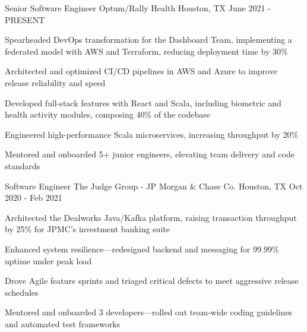 
\begin{cventries}

  \cventry
    {Senior Software Engineer}
    {Optum/Rally Health}
    {Houston, TX}
    {June 2021 - PRESENT}
    {
      \begin{cvitems}
        \item {Spearheaded DevOps transformation for the Dashboard Team, implementing a federated model with AWS and Terraform, reducing deployment time by 30\%}
        \item {Architected and optimized CI/CD pipelines in AWS and Azure to improve release reliability and speed}
        \item {Developed full-stack features with React and Scala, including biometric and health activity modules, composing 40\% of the codebase}
        \item {Engineered high-performance Scala microservices, increasing throughput by 20\%}
        \item {Mentored and onboarded 5+ junior engineers, elevating team delivery and code standards}
      \end{cvitems}
    }

  \cventry
    {Software Engineer}
    {The Judge Group - JP Morgan \& Chase Co.}
    {Houston, TX}
    {Oct 2020 - Feb 2021}
    {
      \begin{cvitems}
        \item {Architected the Dealworks Java/Kafka platform, raising transaction throughput by 25\% for JPMC’s investment banking suite}
        \item {Enhanced system resilience—redesigned backend and messaging for 99.99\% uptime under peak load}
        \item {Drove Agile feature sprints and triaged critical defects to meet aggressive release schedules}
        \item {Mentored and onboarded 3 developers—rolled out team‑wide coding guidelines and automated test frameworks}
      \end{cvitems}
    }


\end{cventries}

